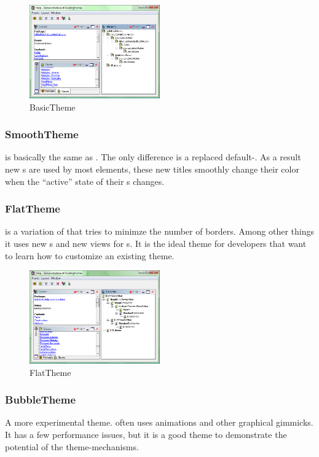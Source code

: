 \begin{figure}[ht]
\centering
\includegraphics[width=0.5\textwidth]{themes/theme_default}
\caption{BasicTheme}
\label{fig:theme_flat}
\end{figure}

\subsubsection{SmoothTheme}
 is basically the same as . The only difference is a replaced default-. As a result new s are used by most elements, these new titles smoothly change their color when the ``active'' state of their s changes.

\subsubsection{FlatTheme}
 is a variation of  that tries to minimze the number of borders. Among other things it uses new s and new views for s. It is the ideal theme for developers that want to learn how to customize an existing theme.

\begin{figure}[ht]
\centering
\includegraphics[width=0.5\textwidth]{themes/theme_flat}
\caption{FlatTheme}
\label{fig:theme_basic}
\end{figure}

\subsubsection{BubbleTheme}
A more experimental theme.  often uses animations and other graphical gimmicks. It has a few performance issues, but it is a good theme to demonstrate the potential of the theme-mechanisms.


